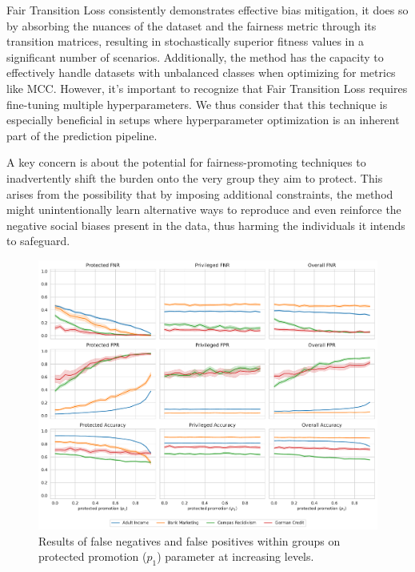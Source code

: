 Fair Transition Loss consistently demonstrates effective bias mitigation, it does so by absorbing the nuances of the dataset and the fairness metric through its transition matrices, resulting in stochastically superior fitness values in a significant number of scenarios. Additionally, the method has the capacity to effectively handle datasets with unbalanced classes when optimizing for metrics like MCC. However, it's important to recognize that Fair Transition Loss requires fine-tuning multiple hyperparameters. We thus consider that this technique is especially beneficial in setups where hyperparameter optimization is an inherent part of the prediction pipeline.

A key concern is about the potential for fairness-promoting techniques to inadvertently shift the burden onto the very group they aim to protect. This arises from the possibility that by imposing additional constraints, the method might unintentionally learn alternative ways to reproduce and even reinforce the negative social biases present in the data, thus harming the individuals it intends to safeguard.  

\begin{figure}[!ht]
\centering
\caption{Results of false negatives and false positives within groups on protected promotion ($p_1$) parameter at increasing levels.}
    \label{fig:ftl_sensibility_test}
    \includegraphics[width=1\linewidth]{images/ftl_sensibility_results.pdf}
\end{figure}

